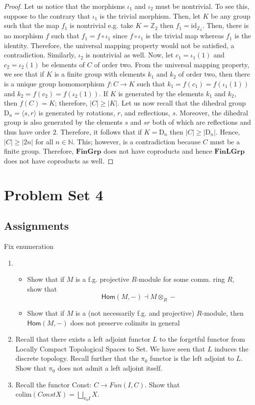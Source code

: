 \documentclass{article}
\newcommand{\N}{\mathbb{N}}
\newcommand{\Z}{\mathbb{Z}}
\begin{document}
\begin{proof}
Let us notice that the morphisms $\iota_{1}$ and $\iota_{2}$ must be nontrivial. To see this, suppose to the contrary that $\iota_{1}$ is the trivial morphism. Then, let $K$ be any group such that the map $f_{1}$ is nontrivial e.g. take $K=\Z_{2}$ then $f_{1}=\text{id}_{\Z_{2}}$. Then, there is no morphism $f$ such that $f_{1}=f\circ \iota_{1}$ since $f\circ \iota_{1}$ is the trivial map whereas $f_{1}$ is the identity. Therefore, the universal mapping property would not be satisfied, a contradiction. Similarly, $\iota_{2}$ is nontrivial as well.
Now, let $c_{1}=\iota_{1}(1)$ and $c_{2}=\iota_{2}(1)$ be elements of $C$ of order two. From the universal mapping property, we see that if $K$ is a finite group with elements $k_{1}$ and $k_{2}$ of order two, then there is a unique group homomorphism $f:C\to K$ such that $k_{1}=f(c_{1})=f(\iota_{1}(1))$ and $k_{2}=f(c_{2})=f(\iota_{2}(1))$. If $K$ is generated by the elements $k_{1}$ and $k_{2}$, then $f(C)=K$; therefore, $|C| \geq |K|$. Let us now recall that the dihedral group $\text{D}_{n}=\langle s,r \rangle$  is  generated by rotations, $r$, and reflections, $s$. Moreover, the dihedral group is also generated by the elements $s$ and $sr$ both of which are reflections and thus have order $2$. Therefore, it follows that if $K=\text{D}_{n}$ then $|C| \geq | \text{D}_{n}|$. Hence, $|C| \geq |2n|$ for all $n\in \N$. This; however, is a contradiction because $C$ must be a finite group. Therefore, $\mathbf{FinGrp}$ does not have coproducts and hence $\mathbf{FinLGrp}$ does not have coproducts as well.

\end{proof}

\section{Problem Set 4}
\subsection{Assignments}
\alert{Fix enumeration}
\begin{enumerate}
	\item \begin{itemize}[a.]
		\item Show that if $M$ is a f.g. projective $R$-module for some comm. ring $R$, show that $$\textsf{Hom}(M,-)\dashv M\otimes_R -$$
		\item Show that if $M$ is a (not necessarily f.g. and projective) $R$-module, then $\textsf{Hom}(M,-)$ does not preserve colimits in general
	\end{itemize}
	\item Recall that there exists a left adjoint functor $L$ to the forgetful functor from Locally Compact Topological Spaces to Set. We have seen that $L$ induces the discrete topology. Recall further that the $\pi_0$ functor is the left adjoint to $L$. Show that $\pi_0$ does not admit a left adjoint itself.
	\item Recall the functor Const: $C\to Fun(I,C)$. Show that $\text{colim}(Const X) = \bigsqcup_{\pi_0 I}X$.
\end{enumerate}


\end{document}
